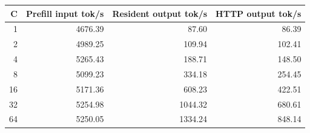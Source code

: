 \begin{tabular}{@{}rrrr@{}}
\toprule
C & Prefill input tok/s & Resident output tok/s & HTTP output tok/s \\
\midrule
1 & 4676.39 & 87.60 & 86.39 \\
2 & 4989.25 & 109.94 & 102.41 \\
4 & 5265.43 & 188.71 & 148.50 \\
8 & 5099.23 & 334.18 & 254.45 \\
16 & 5171.36 & 608.23 & 422.51 \\
32 & 5254.98 & 1044.32 & 680.61 \\
64 & 5250.05 & 1334.24 & 848.14 \\
\bottomrule
\end{tabular}
